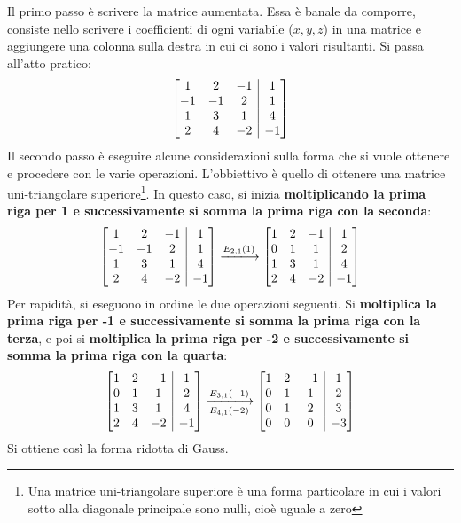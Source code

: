 \documentclass[a4paper]{article}
\makeatletter
\newenvironment{rowequmatbra}[1]{\left[\array{@{}#1@{}}}{\endarray\right]}
\makeatother
\begin{document}
	\noindent
	Il \textcolor{Red3}{primo passo} è scrivere la matrice aumentata. Essa è banale da comporre, consiste nello scrivere i coefficienti di ogni variabile ($x,y,z$) in una matrice e aggiungere una colonna sulla destra in cui ci sono i valori risultanti. Si passa all'atto pratico:
	\begin{equation*}
		\begin{rowequmatbra}{ccc|c}
			 1  &  2 & -1 &  1 \\
			-1  & -1 &  2 &  1 \\
			 1  &  3 &  1 &  4 \\
			 2  &  4 & -2 & -1
		\end{rowequmatbra}
	\end{equation*}
	Il \textcolor{Red3}{secondo passo} è eseguire alcune considerazioni sulla forma che si vuole ottenere e procedere con le varie operazioni. L'obbiettivo è quello di ottenere una matrice uni-triangolare superiore\footnote{Una matrice uni-triangolare superiore è una forma particolare in cui i valori sotto alla diagonale principale sono nulli, cioè uguale a zero}. In questo caso, si inizia \textbf{moltiplicando la prima riga per 1 e successivamente si somma la prima riga con la seconda}:
	\begin{equation*}
		\begin{rowequmatbra}{ccc|c}
			1  &  2 & -1 &  1 \\
			-1  & -1 &  2 &  1 \\
			1  &  3 &  1 &  4 \\
			2  &  4 & -2 & -1
		\end{rowequmatbra} \xlongrightarrow{E_{2,1}\left(1\right)}
		\begin{rowequmatbra}{ccc|c}
			1  & 2 & -1 &  1 \\
			0  & 1 &  1 &  2 \\
			1  & 3 &  1 &  4 \\
			2  & 4 & -2 & -1
		\end{rowequmatbra}
	\end{equation*}
	Per rapidità, si eseguono in ordine le due operazioni seguenti. Si \textbf{moltiplica la prima riga per -1 e successivamente si somma la prima riga con la terza}, e poi si \textbf{moltiplica la prima riga per -2 e successivamente si somma la prima riga con la quarta}:
	\begin{equation*}
		\begin{rowequmatbra}{ccc|c}
			1  & 2 & -1 &  1 \\
			0  & 1 &  1 &  2 \\
			1  & 3 &  1 &  4 \\
			2  & 4 & -2 & -1
		\end{rowequmatbra} \xlongrightarrow[E_{4,1}\left(-2\right)]{E_{3,1}\left(-1\right)}
		\begin{rowequmatbra}{ccc|c}
			1  & 2 & -1 &  1 \\
			0  & 1 &  1 &  2 \\
			0  & 1 &  2 &  3 \\
			0  & 0 &  0 & -3
		\end{rowequmatbra}
	\end{equation*}
	Si ottiene così la forma ridotta di Gauss.\newline
	
\end{document}
